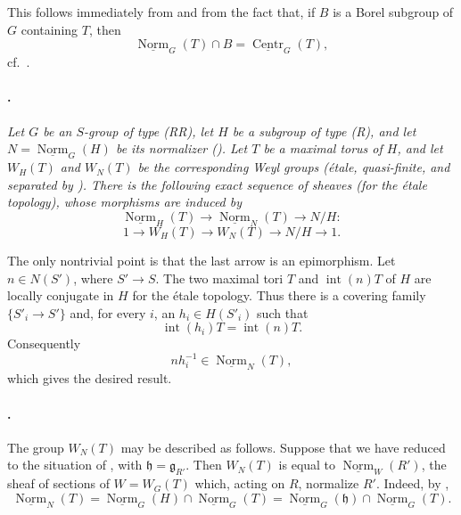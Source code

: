 This follows immediately from  and from the fact that, if
\(B\) is a Borel subgroup of \(G\) containing \(T\), then
\[
  \underline{\operatorname{Norm}}_G(T)\cap B
  =
  \underline{\operatorname{Centr}}_G(T),
\]
cf.\ .

\paragraph{.}
\textit{Let \(G\) be an \(S\)-group of type \textup{(RR)}, let
\(H\) be a subgroup of type \textup{(R)}, and let
\(N=\underline{\operatorname{Norm}}_G(H)\) be its normalizer
\textup{()}. Let \(T\) be a maximal torus of \(H\), and let
\(W_H(T)\) and \(W_N(T)\) be the corresponding Weyl groups
\textup{(étale, quasi-finite, and separated by )}.
There is the following exact sequence of sheaves \textup{(for the
étale topology)}, whose morphisms are induced by}
\[
  \underline{\operatorname{Norm}}_H(T)
  \longrightarrow
  \underline{\operatorname{Norm}}_N(T)
  \longrightarrow
  N/H:
\]
\[
  1
  \longrightarrow W_H(T)
  \longrightarrow W_N(T)
  \longrightarrow N/H
  \longrightarrow 1.
\]

The only nontrivial point is that the last arrow is an epimorphism.
Let \(n\in N(S')\), where \(S'\to S\). The two maximal tori \(T\)
and \(\operatorname{int}(n)T\) of \(H\) are locally conjugate in
\(H\) for the étale topology. Thus there is a covering family
\(\{S'_i\to S'\}\) and, for every \(i\), an
\(h_i\in H(S'_i)\) such that
\[
  \operatorname{int}(h_i)T=\operatorname{int}(n)T.
\]
Consequently
\[
  nh_i^{-1}\in \underline{\operatorname{Norm}}_N(T),
\]
which gives the desired result.

\paragraph{.}
The group \(W_N(T)\) may be described as follows. Suppose that we
have reduced to the situation of , with
\(\mathfrak h=\mathfrak g_{R'}\). Then \(W_N(T)\) is equal to
\(\underline{\operatorname{Norm}}_W(R')\), the sheaf of sections
of \(W=W_G(T)\) which, acting on \(R\), normalize \(R'\). Indeed,
by ,
\[
  \underline{\operatorname{Norm}}_N(T)
  =
  \underline{\operatorname{Norm}}_G(H)
    \cap \underline{\operatorname{Norm}}_G(T)
  =
  \underline{\operatorname{Norm}}_G(\mathfrak h)
    \cap \underline{\operatorname{Norm}}_G(T).
\]


